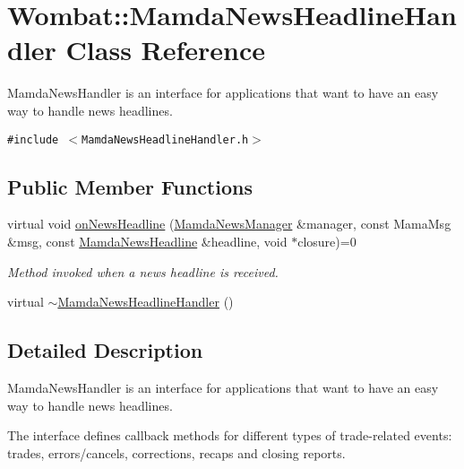 \hypertarget{classWombat_1_1MamdaNewsHeadlineHandler}{
\section{Wombat::Mamda\-News\-Headline\-Handler Class Reference}
\label{classWombat_1_1MamdaNewsHeadlineHandler}
}
Mamda\-News\-Handler is an interface for applications that want to have an easy way to handle news headlines.  


{\tt \#include $<$Mamda\-News\-Headline\-Handler.h$>$}

\subsection*{Public Member Functions}
\begin{CompactItemize}
\item 
virtual void \hyperlink{classWombat_1_1MamdaNewsHeadlineHandler_68c983d4ff1d6e0e1ddbe2bc4d33c0cc}{on\-News\-Headline} (\hyperlink{classWombat_1_1MamdaNewsManager}{Mamda\-News\-Manager} \&manager, const Mama\-Msg \&msg, const \hyperlink{classWombat_1_1MamdaNewsHeadline}{Mamda\-News\-Headline} \&headline, void $\ast$closure)=0
\begin{CompactList}\small\item\em Method invoked when a news headline is received. \item\end{CompactList}\item 
virtual \hyperlink{classWombat_1_1MamdaNewsHeadlineHandler_c9c4b8b97e23bd71dcef739b7c724b97}{$\sim$Mamda\-News\-Headline\-Handler} ()
\end{CompactItemize}


\subsection{Detailed Description}
Mamda\-News\-Handler is an interface for applications that want to have an easy way to handle news headlines. 

The interface defines callback methods for different types of trade-related events: trades, errors/cancels, corrections, recaps and closing reports. 



